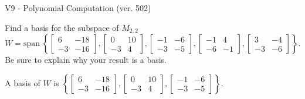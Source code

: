 \begin{exercise}
  \begin{exerciseTitle}V9 - Polynomial Computation (ver. 502)\end{exerciseTitle}
  \begin{exerciseStatement}
    Find a basis for the subspace of \(M_{2,2}\) 
\[W=\mathrm{span}\ \left\{\left[\begin{array}{cc}
6 & -18 \\
-3 & -16
\end{array}\right] , \left[\begin{array}{cc}
0 & 10 \\
-3 & 4
\end{array}\right] , \left[\begin{array}{cc}
-1 & -6 \\
-3 & -5
\end{array}\right] , \left[\begin{array}{cc}
-1 & 4 \\
-6 & -1
\end{array}\right] , \left[\begin{array}{cc}
3 & -4 \\
-3 & -6
\end{array}\right]\right\}.\]
 Be sure to explain why your result is a basis.


  \end{exerciseStatement}
  \begin{exerciseAnswer}
   A basis of \(W\) is  \(\left\{\left[\begin{array}{cc}
6 & -18 \\
-3 & -16
\end{array}\right] , \left[\begin{array}{cc}
0 & 10 \\
-3 & 4
\end{array}\right] , \left[\begin{array}{cc}
-1 & -6 \\
-3 & -5
\end{array}\right]\right\}\).
  


  \end{exerciseAnswer}
\end{exercise}